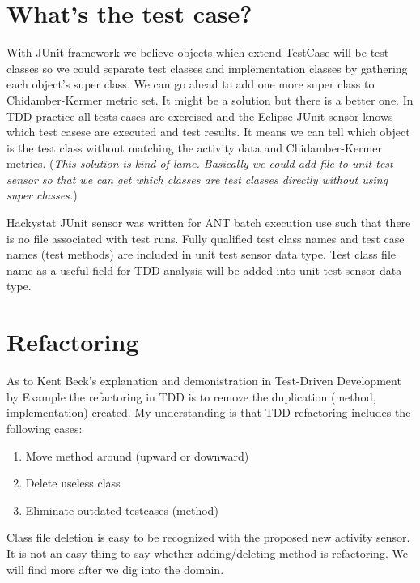 \section{What's the test case?}
With JUnit framework we believe objects which extend {TestCase} will be
test classes so we could separate test classes and implementation classes
by gathering each object's super class. We can go ahead to add one more
super class to Chidamber-Kermer metric set. It might be a solution but
there is a better one. In TDD practice all tests cases are exercised and
the Eclipse JUnit sensor knows which test casese are executed and test
results. It means we can tell which object is the test class without
matching the activity data and Chidamber-Kermer metrics.  (\emph{This
solution is kind of lame. Basically we could add file to unit test sensor
so that we can get which classes are test classes directly without using
super classes.})

Hackystat JUnit sensor was written for ANT batch execution use such that
there is no file associated with test runs. Fully qualified test class names
and test case names (test methods) are included in unit test sensor data
type. Test class file name as a useful field for TDD analysis will be added
into unit test sensor data type.

\section{Refactoring}
As to Kent Beck's explanation and demonistration in Test-Driven Development
by Example \cite{Beck_TDD_2003} the refactoring in TDD is to remove the
duplication (method, implementation) created. My understanding is that TDD
refactoring includes the following cases:
\begin{enumerate}
\item Move method around (upward or downward)
\item Delete useless class
\item Eliminate outdated testcases (method)
\end{enumerate}

Class file deletion is easy to be recognized with the proposed new activity
sensor. It is not an easy thing to say whether adding/deleting method is
refactoring. We will find more after we dig into the domain.















